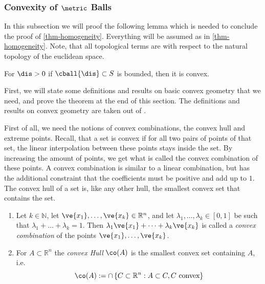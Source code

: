 \subsubsection{Convexity of $\metric$ Balls} \label{sec-ball-convexity}

In this subsection we will proof the following lemma which is needed to conclude the proof of \cref{thm-homogeneity}. Everything will be assumed as in \cref{thm-homogeneity}. Note, that all topological terms are with respect to the natural topology of the euclidean space.
\begin{lem} \label{lem-metr-spheres-convex}
	For $\dis> 0$ if $\cball{\dis} \subset S$ is bounded, then it is convex.
\end{lem}

First, we will state some definitions and results on basic convex geometry that we need, and prove the theorem at the end of this section. The definitions and results on convex geometry are taken out of \parencite{lecturesConvGeo}.

First of all, we need the notions of convex combinations, the convex hull and extreme points.
Recall, that a set is convex if for all two pairs of points of that set, the linear interpolation between these points stays inside the set. By increasing the amount of points, we get what is called the convex combination of these points. A convex combination is similar to a linear combination, but has the additional constraint that the coefficients must be positive and add up to $1$. The convex hull of a set is, like any other hull, the smallest convex set that contains the set.
\begin{defi} \label{def-conv-and-comb-hull}
	\leavevmode \vspace{-\baselineskip}
	\begin{enumerate}
    \item Let $k \in \mathbb{N}$, let $\ve{x_1}, \dots, \ve{x_k} \in \mathbb{R}^{n}$, and let $\lambda_1, \dots, \lambda_k \in [0,1]$ be such that $\lambda_1 + \dots + \lambda_k = 1$. Then $\lambda_1 \ve{x_1} + \dots + \lambda_k \ve{x_k}$ is called a \emph{convex combination} of the points $\ve{x_1}, \dots, \ve{x_k}$. 
    \item For $A \subset \mathbb{R}^{n}$ the \emph{convex Hull} $\co(A)$ is the smallest convex set containing $A$, i.e. $$\co(A) := \cap \left \{ C \subset \mathbb{R}^n:A \subset C,  C \text{ convex} \right \}$$  %
	\end{enumerate}
\end{defi}

